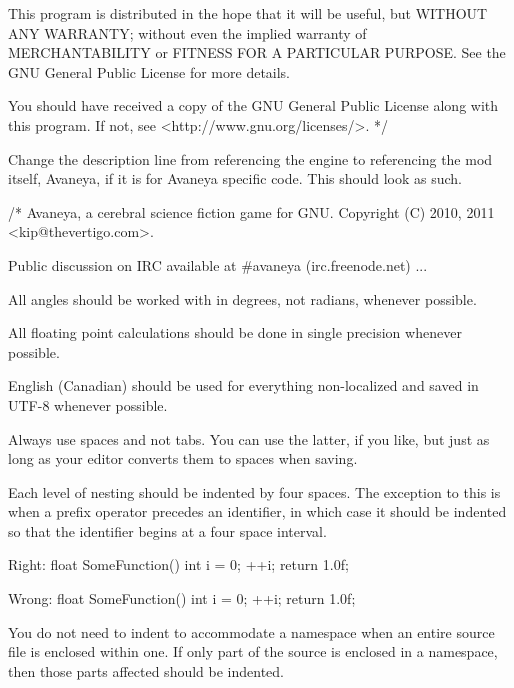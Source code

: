     This program is distributed in the hope that it will be useful,
    but WITHOUT ANY WARRANTY; without even the implied warranty of
    MERCHANTABILITY or FITNESS FOR A PARTICULAR PURPOSE.  See the
    GNU General Public License for more details.

    You should have received a copy of the GNU General Public License
    along with this program.  If not, see <http://www.gnu.org/licenses/>.
*/
\stopCodeExample

Change the description line from referencing the engine to referencing the mod itself, Avaneya, if it is for Avaneya specific code. This should look as such.

\startCodeExample
/*
    Avaneya, a cerebral science fiction game for GNU.
    Copyright (C) 2010, 2011 <kip@thevertigo.com>.

    Public discussion on IRC available at #avaneya (irc.freenode.net)
    ...
\stopCodeExample


\startitemize[3]
\setupwhitespace[big]
\item
All angles should be worked with in degrees, not radians, whenever possible.

\item
All floating point calculations should be done in single precision whenever possible.
\stopitemize


\startitemize[3]
\setupwhitespace[big]
\item
English (Canadian) should be used for everything non-localized and saved in UTF-8 whenever possible.

\item
Always use spaces and not tabs. You can use the latter, if you like, but just as long as your editor converts them to spaces when saving.

\item
Each level of nesting should be indented by four spaces. The exception to this is when a prefix operator precedes an identifier, in which case it should be indented so that the identifier begins at a four space interval.

Right:
\startCodeExample
float SomeFunction()
{
    int i = 0;
  ++i;
    return 1.0f;
}
\stopCodeExample

Wrong:
\startCodeExample
float SomeFunction()
{
    int i = 0;
    ++i;
        return 1.0f;
}
\stopCodeExample

\item
You do not need to indent to accommodate a namespace when an entire source file is enclosed within one. If only part of the source is enclosed in a namespace, then those parts affected should be indented.

